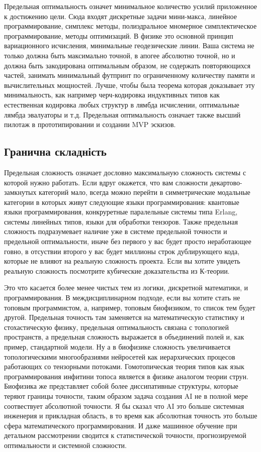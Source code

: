 Предельная оптимальность означет минимальное количество усилий приложенное к достижению цели. Сюда входят дискретные задачи мини-макса, линейное программирование, симплекс методы, полиэдральное мномерное симплектическое программирование, методы оптимизаций. В физике это основной принцип вариационного исчисления, минимальные геодезические линии. Ваша система не только должна быть максимально точной, в апогее абсолютно точной, но и должна быть закодирована оптимальным образом, не содержать повторяющихся частей, занимать минимальный футпринт по ограниченному количеству памяти и вычислительных мощностей. Лучше, чтобы была теорема которая доказывает эту минимальность, как например черч-кодировка индуктивных типов как естественная кодировка любых структур в лямбда исчислении, оптимальные лямбда эвалуаторы и т.д. Предельная оптимальность означает также высший пилотаж в прототипировании и создании MVP эскизов.

\subsection{Гранична складність}

Предельная сложность означает дословно максимальную сложность системы с которой нужно работать. Если вдруг окажется, что вам сложности декартово-замкнутых категорий мало, всегда можно перейти в симметрические модальные категории в которых живут следующие языки программирования: квантовые языки программирования, конкруретные паралельные системы типа Erlang, системы линейных типов, языки для обработки тензоров. Также предельная сложность подразумевает наличие уже в системе предельной точности и предельной оптимальности, иначе без первого у вас будет просто неработающее говно, в отсуствии второго у вас будет миллионы строк дублирующего кода, которые не влияют на реальную сложность проекта. Если вы хотите увидеть реальную сложность посмотрите кубические доказательства из К-теории.

Это что касается более менее чистых тем из логики, дискретной математики, и программирования. В междисциплинарном подходе, если вы хотите стать не топовым программистом, а, например, топовым биофизиком, то список тем будет другой. Предельная точность там заменяется на математическую статистику и стохастическую физику, предельная оптимальность связана с топологией пространств, а предельная сложность выражается в объединений полей и, как пример, стандартной модели. Ну а в биофизике сложность увеличивается топологическими многообразиями нейросетей как иерархических процесов работающих со тензорными потоками. Гомотопическая теория типов как язык программирования инфитини топоса является в физике аналогом теории струн. Биофизика же представляет собой более диссипативные структуры, которые теряют границы точности, таким образом задача создания AI не в полной мере соотвествует абсолютной точности. Я бы сказал что AI это больше системная инженерия и прикладная область, в то время как абсолютная точность это больше сфера математического программирования. И даже машинное обучение при детальном рассмотрении сводится к статистической точности, прогнозируемой оптимальности и системной сложности.

